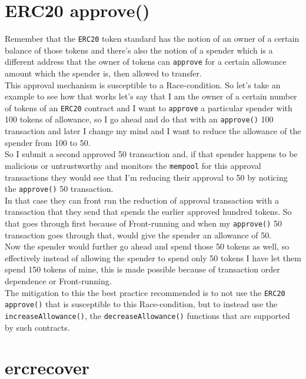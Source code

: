 \section{ERC20 approve()}

Remember that the \texttt{ERC20} token standard has the notion of an owner of a certain balance of those tokens and there's also the notion of a spender which is a different address that the owner of tokens can \texttt{approve} for a certain allowance amount which the spender is, then allowed to transfer.\\ 

This approval mechanism is susceptible to a Race-condition. So let's take an example to see how that works let's say that I am the owner of a certain number of tokens of an \texttt{ERC20} contract and I want to \texttt{approve} a particular spender with 100 tokens of allowance, so I go ahead and do that with an \texttt{approve()} 100 transaction and later I change my mind and I want to reduce the allowance of the spender from 100 to 50. \\

So I submit a second approved 50 transaction and, if that spender happens to be malicious or untrustworthy and monitors the \texttt{mempool} for this approval transactions they would see that I'm reducing their approval to 50 by noticing the \texttt{approve()} 50 transaction.\\

In that case they can front run the reduction of approval transaction with a transaction that they send that spends the earlier approved hundred tokens. So that goes through first because of Front-running and when my \texttt{approve()} 50 transaction goes through that, would give the spender an allowance of 50. \\

Now the spender would further go ahead and spend those 50 tokens as well, so effectively instead of allowing the spender to spend only 50 tokens I have let them spend 150 tokens of mine, this is made possible because of transaction order dependence or Front-running.\\

The mitigation to this the best practice recommended is to not use the \texttt{ERC20} \texttt{approve()} that is susceptible to this Race-condition, but to instead use the \texttt{increaseAllowance()}, the \texttt{decreaseAllowance()} functions that are supported by such contracts.

\section{ercrecover}

